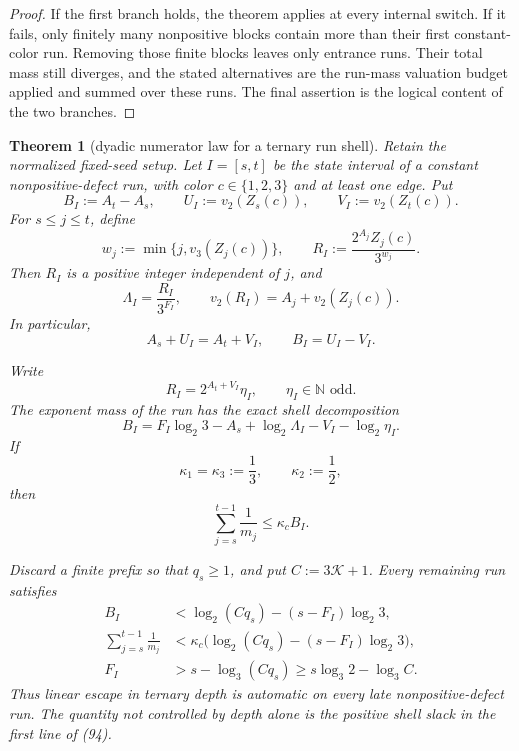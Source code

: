 \documentclass[11pt]{article}
\newtheorem{theorem}{Theorem}
\begin{document}
\begin{proof}
If the first branch holds, the theorem applies at every internal switch.
If it fails, only finitely many nonpositive blocks contain more than their
first constant-color run.  Removing those finite blocks leaves only entrance
runs.  Their total mass still diverges, and the stated alternatives are the
run-mass valuation budget applied and summed over these runs.  The final
assertion is the logical content of the two branches.
\end{proof}

\begin{theorem}[dyadic numerator law for a ternary run shell]
Retain the normalized fixed-seed setup.  Let $I=[s,t]$ be the state
interval of a constant nonpositive-defect run, with color
$c\in\{1,2,3\}$ and at least one edge.  Put
\[
  B_I:=A_t-A_s,
  \qquad
  U_I:=v_2(Z_s(c)),
  \qquad
  V_I:=v_2(Z_t(c)).
  \tag{86}
\]
For $s\leq j\leq t$, define
\[
  w_j:=\min\{j,v_3(Z_j(c))\},
  \qquad
  R_I:=\frac{2^{A_j}Z_j(c)}{3^{w_j}}.
  \tag{87}
\]
Then $R_I$ is a positive integer independent of $j$, and
\[
\boxed{
  \Lambda_I=\frac{R_I}{3^{F_I}},
  \qquad
  v_2(R_I)=A_j+v_2(Z_j(c)).}
\tag{88}
\]
In particular,
\[
\boxed{
  A_s+U_I=A_t+V_I,
  \qquad
  B_I=U_I-V_I.}
\tag{89}
\]

Write
\[
  R_I=2^{A_t+V_I}\eta_I,
  \qquad \eta_I\in\mathbb N\text{ odd}.
  \tag{90}
\]
The exponent mass of the run has the exact shell decomposition
\[
\boxed{
  B_I
  =F_I\log_2 3-A_s+\log_2\Lambda_I
   -V_I-\log_2\eta_I.}
\tag{91}
\]
If
\[
  \kappa_1=\kappa_3:=\frac13,
  \qquad
  \kappa_2:=\frac12,
  \tag{92}
\]
then
\[
\boxed{
  \sum_{j=s}^{t-1}\frac1{m_j}
  \leq\kappa_cB_I.}
\tag{93}
\]

Discard a finite prefix so that $q_s\geq1$, and put
$C:=3\mathcal K+1$.  Every remaining run satisfies
\[
\boxed{\begin{aligned}
  B_I
  &<\log_2(Cq_s)-(s-F_I)\log_2 3,\\
  \sum_{j=s}^{t-1}\frac1{m_j}
  &<\kappa_c\bigl(\log_2(Cq_s)
        -(s-F_I)\log_2 3\bigr),\\
  F_I
  &>s-\log_3(Cq_s)
   \geq s\log_3 2-\log_3 C.
\end{aligned}}
\tag{94}
\]
Thus linear escape in ternary depth is automatic on every late
nonpositive-defect run.  The quantity not controlled by depth alone is the
positive shell slack in the first line of (94).
\end{theorem}
\end{document}
